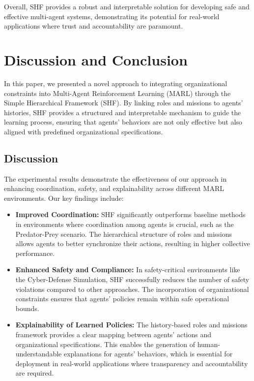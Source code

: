 \documentclass[sigconf,anonymous]{aamas}
\begin{document}
Overall, SHF provides a robust and interpretable solution for developing safe and effective multi-agent systems, demonstrating its potential for real-world applications where trust and accountability are paramount.



\section{Discussion and Conclusion}
\label{sec:discussion_conclusion}

In this paper, we presented a novel approach to integrating organizational constraints into Multi-Agent Reinforcement Learning (MARL) through the Simple Hierarchical Framework (SHF). By linking roles and missions to agents' histories, SHF provides a structured and interpretable mechanism to guide the learning process, ensuring that agents' behaviors are not only effective but also aligned with predefined organizational specifications.

\subsection{Discussion}
The experimental results demonstrate the effectiveness of our approach in enhancing coordination, safety, and explainability across different MARL environments. Our key findings include:

\begin{itemize}
    \item \textbf{Improved Coordination:} SHF significantly outperforms baseline methods in environments where coordination among agents is crucial, such as the Predator-Prey scenario. The hierarchical structure of roles and missions allows agents to better synchronize their actions, resulting in higher collective performance.
    \item \textbf{Enhanced Safety and Compliance:} In safety-critical environments like the Cyber-Defense Simulation, SHF successfully reduces the number of safety violations compared to other approaches. The incorporation of organizational constraints ensures that agents' policies remain within safe operational bounds.
    \item \textbf{Explainability of Learned Policies:} The history-based roles and missions framework provides a clear mapping between agents' actions and organizational specifications. This enables the generation of human-understandable explanations for agents' behaviors, which is essential for deployment in real-world applications where transparency and accountability are required.
\end{itemize}
\end{document}
